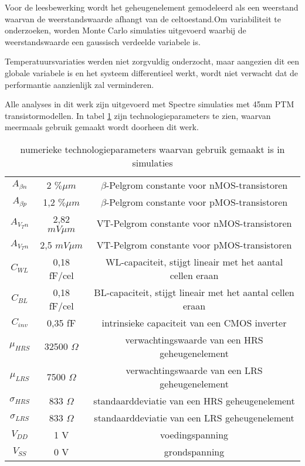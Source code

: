 Voor de leesbewerking wordt het geheugenelement gemodeleerd als een weerstand waarvan de weerstandswaarde afhangt van de celtoestand.Om variabiliteit te onderzoeken, worden Monte Carlo simulaties uitgevoerd waarbij de weerstandswaarde een gaussisch verdeelde variabele is.

Temperatuursvariaties werden niet zorgvuldig onderzocht, maar aangezien dit een globale variabele is en het systeem differentieel werkt, wordt niet verwacht dat de performantie aanzienlijk zal verminderen.

Alle analyses in dit werk zijn uitgevoerd met Spectre simulaties met 45nm PTM transistormodellen. In tabel \ref{tab:properties} zijn technologieparameters te zien, waarvan meermaals gebruik gemaakt wordt doorheen dit werk.

\begin{table}
	\begin{tabular}{ccc}
	\hline
    $A_{\beta n}$ & 2 $\% \mu m$ & $\beta$-Pelgrom constante voor nMOS-transistoren \\
    $A_{\beta p}$ & 1,2 $\% \mu m$ & $\beta$-Pelgrom constante voor pMOS-transistoren \\
    $A_{V_{T} n}$ & 2,82 $mV \mu m$ & VT-Pelgrom constante voor nMOS-transistoren \\
    $A_{V_{T} n}$ & 2,5 $mV \mu m$ & VT-Pelgrom constante voor pMOS-transistoren \\
    $C_{WL}$ & 0,18 fF/cel & WL-capaciteit, stijgt lineair met het aantal cellen eraan \\
    $C_{BL}$ & 0,18 fF/cel & BL-capaciteit, stijgt lineair met het aantal cellen eraan \\
    $C_{inv}$ & 0,35 fF & intrinsieke capaciteit van een CMOS inverter \\
    $\mu_{HRS}$ & 32500 $\Omega$ & verwachtingswaarde van een HRS geheugenelement \\
    $\mu_{LRS}$ & 7500 $\Omega$ & verwachtingswaarde van een LRS geheugenelement \\
    $\sigma_{HRS}$ & 833 $\Omega$ & standaarddeviatie van een HRS geheugenelement \\
    $\sigma_{LRS}$ & 833 $\Omega$ & standaarddeviatie van een LRS geheugenelement \\
    $V_{DD}$ & 1 V & voedingspanning \\
    $V_{SS}$ & 0 V & grondspanning \\
    \hline
  \end{tabular}
  \caption[technologieparameters]{numerieke technologieparameters waarvan gebruik gemaakt is in simulaties}
  \label{tab:properties}
\end{table}


